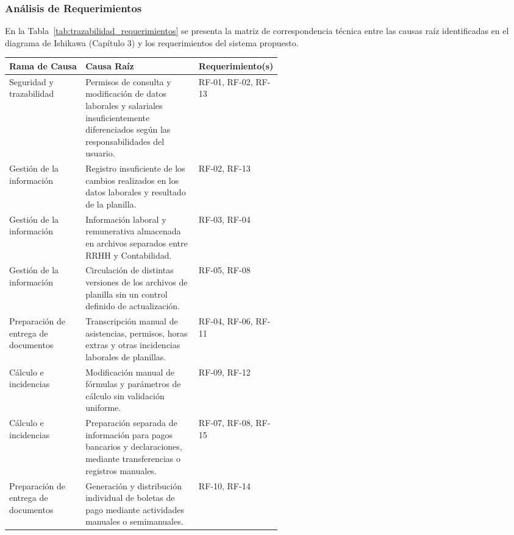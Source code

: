 \subsubsection{Análisis de Requerimientos}

En la Tabla~\ref{tab:trazabilidad_requerimientos} se presenta la matriz de correspondencia técnica entre las causas raíz identificadas en el diagrama de Ishikawa (Capítulo 3) 
y los requerimientos del sistema propuesto.

\par
\noindent
\begin{minipage}{\linewidth}

    \begingroup
    \renewcommand{\baselinestretch}{1}
    \footnotesize
    \setlength{\tabcolsep}{4pt}
    \renewcommand{\arraystretch}{1.2}

    \begin{tabularx}{\linewidth}{@{}p{0.28\linewidth}Xp{0.24\linewidth}@{}}
        \toprule
        \textbf{Rama de Causa} & \textbf{Causa Raíz} & \textbf{Requerimiento(s)} \\ \midrule
        Seguridad y trazabilidad & Permisos de consulta y modificación de datos laborales y salariales insuficientemente diferenciados según las responsabilidades del usuario. & RF-01, RF-02, RF-13 \\ \addlinespace
        Gestión de la información & Registro insuficiente de los cambios realizados en los datos laborales y resultado de la planilla. & RF-02, RF-13 \\ \addlinespace
        Gestión de la información & Información laboral y remunerativa almacenada en archivos separados entre RRHH y Contabilidad. & RF-03, RF-04 \\ \addlinespace
        Gestión de la información & Circulación de distintas versiones de los archivos de planilla sin un control definido de actualización. & RF-05, RF-08 \\ \addlinespace
        Preparación de entrega de documentos & Transcripción manual de asistencias, permisos, horas extras y otras incidencias laborales de planillas. & RF-04, RF-06, RF-11 \\ \addlinespace
        Cálculo e incidencias & Modificación manual de fórmulas y parámetros de cálculo sin validación uniforme. & RF-09, RF-12 \\ \addlinespace
        Cálculo e incidencias & Preparación separada de información para pagos bancarios y declaraciones, mediante transferencias o registros manuales. & RF-07, RF-08, RF-15 \\ \addlinespace
        Preparación de entrega de documentos & Generación y distribución individual de boletas de pago mediante actividades manuales o semimanuales. & RF-10, RF-14 \\ \bottomrule
    \end{tabularx}
    \endgroup

\end{minipage}
\finBloqueAPA

